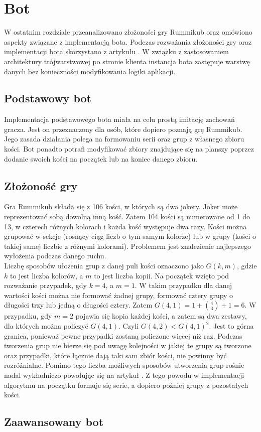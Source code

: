 \chapter{Bot}
\thispagestyle{chapterBeginStyle}

W ostatnim rozdziale przeanalizowano złożoności gry Rummikub oraz omówiono aspekty związane z implementacją bota. 
 Podczas rozważania złożoności gry oraz implementacji bota skorzystano z artykułu \cite{RummikubComplexity}. W związku z zastosowaniem architektury trójwarstwowej po stronie klienta instancja bota 
 zastępuje  warstwę danych bez konieczności modyfikowania logiki aplikacji.

\section{Podstawowy bot}

Implementacja podstawowego bota miała na celu prostą imitację 
zachowań 
gracza. Jest on przeznaczony dla osób, które dopiero poznają grę Rummikub. Jego zasada działania polega na formowaniu serii oraz grup z własnego zbioru kości. Bot ponadto potrafi modyfikować zbiory znajdujące się na planszy poprzez dodanie swoich kości na początek lub na koniec danego zbioru.

\section{Złożoność gry}

Gra Rummikub składa się z 106 kości, w których są dwa jokery. Joker może reprezentować sobą dowolną inną kość. Zatem 104 kości są numerowane od 1 do 13, w czterech różnych kolorach i każda kość występuje dwa razy. Kości można grupować w sekcje (rosnący ciąg liczb o tym samym kolorze) lub w grupy (kości o takiej samej liczbie z różnymi kolorami). Problemem jest znalezienie najlepszego wyłożenia podczas danego ruchu. \\

 Liczbę sposobów ułożenia grup z danej puli kości oznaczono jako $G(k, m)$, gdzie $k$ to jest liczba kolorów, a $m$ to jest liczba kopii. Na początek wzięto pod rozważanie przypadek, gdy $k = 4$, a $m = 1$. W takim przypadku dla danej wartości kości można nie formować żadnej grupy, formować cztery grupy o długości trzy lub jedną o długości cztery. Zatem $G(4,1) = 1 + {{4}\choose{3}} + 1 = 6$. W przypadku, gdy $m = 2$ pojawia się kopia każdej kości, a zatem są dwa zestawy, dla których można policzyć $G(4,1)$. Czyli $G(4,2) < G(4,1)^2$. Jest to górna granica, ponieważ pewne przypadki zostaną policzone więcej niż raz. Podczas tworzenia grup nie bierze się pod uwagę kolejności w jakiej te grupy są tworzone oraz przypadki, które łącznie dają taki sam zbiór kości, nie powinny być rozróżnialne. Pomimo tego liczba możliwych sposobów utworzenia grup rośnie nadal wykładniczo powołując się na artykuł \cite{RummikubComplexity}. Z tego powodu w implementacji algorytmu na początku formuje się serie, a dopiero poźniej grupy z pozostałych kości.
 

\section{Zaawansowany bot}



